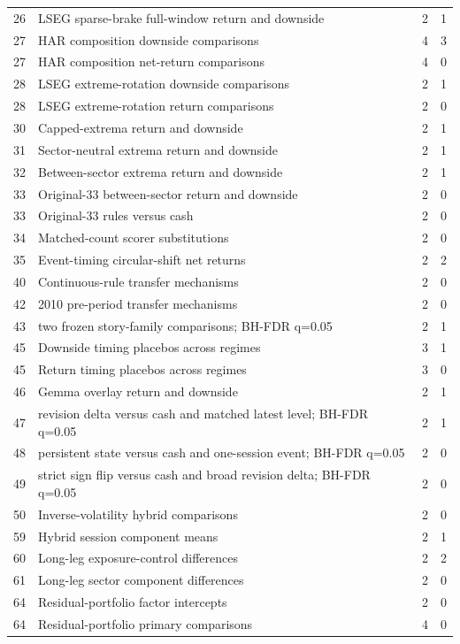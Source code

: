 \begin{longtable}{r p{9.2cm} rr}
26 & LSEG sparse-brake full-window return and downside & 2 & 1 \\
27 & HAR composition downside comparisons & 4 & 3 \\
27 & HAR composition net-return comparisons & 4 & 0 \\
28 & LSEG extreme-rotation downside comparisons & 2 & 1 \\
28 & LSEG extreme-rotation return comparisons & 2 & 0 \\
30 & Capped-extrema return and downside & 2 & 1 \\
31 & Sector-neutral extrema return and downside & 2 & 1 \\
32 & Between-sector extrema return and downside & 2 & 1 \\
33 & Original-33 between-sector return and downside & 2 & 0 \\
33 & Original-33 rules versus cash & 2 & 0 \\
34 & Matched-count scorer substitutions & 2 & 0 \\
35 & Event-timing circular-shift net returns & 2 & 2 \\
40 & Continuous-rule transfer mechanisms & 2 & 0 \\
42 & 2010 pre-period transfer mechanisms & 2 & 0 \\
43 & two frozen story-family comparisons; BH-FDR q=0.05 & 2 & 1 \\
45 & Downside timing placebos across regimes & 3 & 1 \\
45 & Return timing placebos across regimes & 3 & 0 \\
46 & Gemma overlay return and downside & 2 & 1 \\
47 & revision delta versus cash and matched latest level; BH-FDR q=0.05 & 2 & 1 \\
48 & persistent state versus cash and one-session event; BH-FDR q=0.05 & 2 & 0 \\
49 & strict sign flip versus cash and broad revision delta; BH-FDR q=0.05 & 2 & 0 \\
50 & Inverse-volatility hybrid comparisons & 2 & 0 \\
59 & Hybrid session component means & 2 & 1 \\
60 & Long-leg exposure-control differences & 2 & 2 \\
61 & Long-leg sector component differences & 2 & 0 \\
64 & Residual-portfolio factor intercepts & 2 & 0 \\
64 & Residual-portfolio primary comparisons & 4 & 0 \\

\end{longtable}
